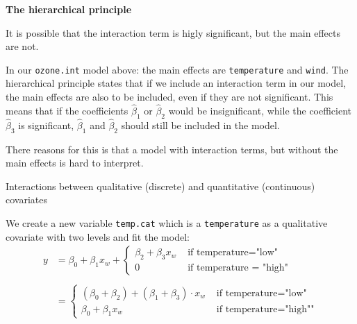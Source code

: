 \documentclass[10pt,ignorenonframetext,]{beamer}
\begin{document}
\begin{frame}[fragile]

\textbf{The hierarchical principle}

It is possible that the interaction term is higly significant, but the
main effects are not.

In our \texttt{ozone.int} model above: the main effects are
\texttt{temperature} and \texttt{wind}. The hierarchical principle
states that if we include an interaction term in our model, the main
effects are also to be included, even if they are not significant. This
means that if the coefficients \(\hat \beta_1\) or \(\hat \beta_2\)
would be insignificant, while the coefficient \(\hat \beta_3\) is
significant, \(\hat \beta_1\) and \(\hat \beta_2\) should still be
included in the model.

There reasons for this is that a model with interaction terms, but
without the main effects is hard to interpret.

\end{frame}

\begin{frame}[fragile]

\begin{block}{Interactions between qualitative (discrete) and
quantitative (continuous) covariates}

We create a new variable \texttt{temp.cat} which is a
\texttt{temperature} as a qualitative covariate with two levels and fit
the model:
\[\begin{aligned}y&=\beta_0 + \beta_1 x_w + \begin{cases} \beta_2 + \beta_3  x_w  &\text{ if temperature="low"}\\ 0 &\text{ if temperature = "high"}\end{cases} \\\\ &= \begin{cases} (\beta_0 + \beta_2) + (\beta_1 + \beta_3) \cdot x_w &\text{ if temperature="low"}\\ \beta_0 + \beta_1 x_w &\text{ if temperature="high""} \end{cases} \end{aligned}\]

\end{block}

\end{frame}
\end{document}
